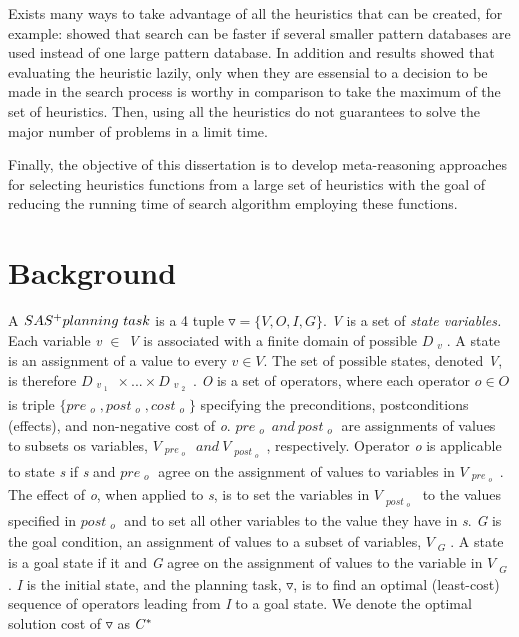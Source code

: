 \documentclass[a4paper,12pt]{article}
\begin{document}
Exists many ways to take advantage of all the heuristics that can be created, for example: \citep{holte2006maximizing} showed that search can be faster if several smaller pattern databases are used instead of one large pattern database. In addition \citep{domshlak2010max} and \citep{tolpin2013towards} results showed that evaluating the heuristic lazily, only when they are essensial to a decision to be made in the search process is worthy in comparison to take the maximum of the set of heuristics. Then, using all the heuristics do not guarantees to solve the major number of problems in a limit time.

Finally, the objective of this dissertation is to develop meta-reasoning approaches for selecting heuristics functions from a large set of heuristics with the goal of reducing the running time of search algorithm employing these functions.

\section{Background}
A $SAS\sp{+} planning\ task$ \citep{backstrom1995complexity} is a 4 tuple $\triangledown = \{V, O, I, G\}.$ \textit{V} is a set of \textit{state variables.} Each variable \textit{v} $\in$ \textit{V} is associated with a finite domain of possible $D_{\substack{v}}$. A state is an assignment of a value to every $v \in V.$ The set of possible states, denoted \textit{V}, is therefore $D_{\substack{v_{\substack{1}}}}    \times ... \times D_{\substack{v_{\substack{2}}}}$. \textit{O} is a set of operators, where each operator $o \in O$ is triple $\{pre_{\substack{o}} , post_{\substack{o}}, cost_{\substack{o}}\}$ specifying the preconditions, postconditions (effects), and non-negative cost of \textit{o}. $pre_{\substack{o}}\ and\ post_{\substack{o}}$ are assignments of values to subsets os variables, $V_{\substack{pre_{\substack{o}}}}\ and\ V_{\substack{post_{\substack{o}}}}$, respectively. Operator \textit{o} is applicable to state \textit{s} if \textit{s} and $pre_{\substack{o}}$ agree on the assignment of values to variables in $V_{\substack{pre_{\substack{o}}}}$. The effect of \textit{o}, when applied to \textit{s}, is to set the variables in $V_{\substack{post_{\substack{o}}}}$ to the values specified in $post_{\substack{o}}$ and to set all other variables to the value they have in \textit{s}. \textit{G} is the goal condition, an assignment of values to a subset of variables, $V_{\substack{G}}$. A state is a goal state if it and \textit{G} agree on the assignment of values to the variable in $V_{\substack{G}}$. \textit{I} is the initial state, and the planning task, $\triangledown$, is to find an optimal (least-cost) sequence of operators leading from \textit{I} to a goal state. We denote the optimal solution cost of $\triangledown$ as $C\sp{*}$
\end{document}

